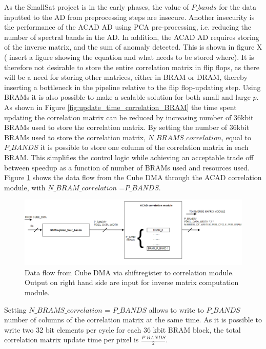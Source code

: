 As the SmallSat project is in the early phases, the value of $P\_bands$ for the data inputted to the AD from preprocessing steps are insecure. Another insecurity is the performance of the ACAD AD using PCA pre-processing, i.e. reducing the number of spectral bands in the AD. In addition, the ACAD AD requires storing of the inverse matrix, and the sum of anomaly detected. This is shown in figure X ( insert a figure showing the equation and what needs to be stored where). It is therefore not desirable to store the entire correlation matrix in flip flops, as there will be a need for storing other matrices, either in BRAM or DRAM, thereby inserting a bottleneck in the pipeline relative to the flip flop-updating step. Using BRAMs it is also possible to make a scalable solution for both small and large $p$. 
\\


As shown in Figure \ref{fig:update_time_correlation_BRAM} the time spent updating the correlation matrix can be reduced by increasing number of 36kbit BRAMs used to store the correlation matrix. By setting the  number of 36kbit BRAMs used to store the correlation matrix, $N\_BRAMS\_correlation$, equal to $P\_BANDS$ it is possible to store one column of the correlation matrix in each BRAM. This simplifies the control logic while achieving an acceptable trade off between speedup as a function of number of BRAMs used and resources used. Figure \ref{fig:data_flow_cube_dma_to_inverse} shows the data flow from the Cube DMA through the ACAD correlation module, with $N\_BRAM\_correlation$ =$P\_BANDS$. 
\\


\begin{figure}[H]
\centering
   \includegraphics[scale=0.5]{images/data_flow_cube_dma_to_inverse_module.PNG}
  \caption{Data flow from Cube DMA via shiftregister to correlation module. Output on right hand side are input for inverse matrix computation module.  } 
  \label{fig:data_flow_cube_dma_to_inverse}
\end{figure}

Setting $N\_BRAMS\_correlation$ = $P\_BANDS$ allows to write to $P\_BANDS$ number of columns of the correlation matrix at the same time. As it is possible to write two 32 bit elements per cycle for each 36 kbit BRAM block, the total correlation matrix update time per pixel is $\frac{P\_BANDS}{2}$. 


